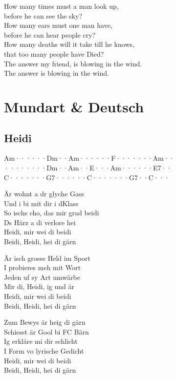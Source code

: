 \documentclass[
  letterpaper,
]{scrbook}
\begin{document}
How many times must a man look up,\\
before he can see the sky?\\
How many ears must one man have,\\
before he can hear people cry?\\
How many deaths will it take \textquotesingle till he knows,\\
that too many people have Died?\\
The answer my friend, is blowing in the wind.\\
The answer is blowing in the wind.

\part{Mundart \& Deutsch}

\hypertarget{heidi}{%
\chapter{Heidi}\label{heidi}}

\textbar Am······\textbar Dm··Am··\textbar····F···\textbar····Am··\textbar{}\\
\textbar········\textbar Dm··Am··\textbar E···Am··\textbar····E7··\textbar{}\\
\textbar C·······\textbar G7······\textbar C·······\textbar G7··C···\textbar{}

Är wohnt a dr glyche Gass\\
Und i bi mit dir i d\textquotesingle Klass\\
So ischs cho, das mir grad beidi\\
Ds Härz a di verlore hei\\
Heidi, mir wei di beidi\\
Beidi, Heidi, hei di gärn

Är isch grosse Held im Sport\\
I probieres meh mit Wort\\
Jeden uf sy Art umwärbe\\
Mir di, Heidi, ig und är\\
Heidi, mir wei di beidi\\
Beidi, Heidi, hei di gärn

Zum Bewys är heig di gärn\\
Schiesst är Gool bi FC Bärn\\
Ig erkläre mi dir schlicht\\
I Form vo lyrische Gedicht\\
Heidi, mir wei di beidi\\
Beidi, Heidi, hei di gärn
\end{document}

